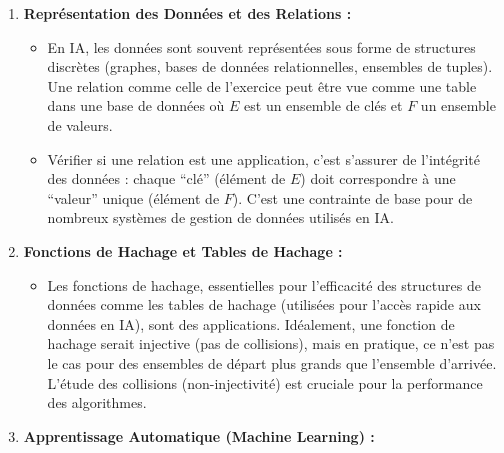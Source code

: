 \documentclass[12pt,a4paper]{report}
\providecommand{\tightlist}{%
  \setlength{\itemsep}{0pt}\setlength{\parskip}{0pt}}
\begin{document}
\begin{enumerate}
\def\labelenumi{\arabic{enumi}.}
\tightlist
\item
  \textbf{Représentation des Données et des Relations :}

  \begin{itemize}
  \tightlist
  \item
    En IA, les données sont souvent représentées sous forme de
    structures discrètes (graphes, bases de données relationnelles,
    ensembles de tuples). Une relation comme celle de l'exercice peut
    être vue comme une table dans une base de données où \(E\) est un
    ensemble de clés et \(F\) un ensemble de valeurs.
  \item
    Vérifier si une relation est une application, c'est s'assurer de
    l'intégrité des données : chaque ``clé'' (élément de \(E\)) doit
    correspondre à une ``valeur'' unique (élément de \(F\)). C'est une
    contrainte de base pour de nombreux systèmes de gestion de données
    utilisés en IA.
  \end{itemize}
\item
  \textbf{Fonctions de Hachage et Tables de Hachage :}

  \begin{itemize}
  \tightlist
  \item
    Les fonctions de hachage, essentielles pour l'efficacité des
    structures de données comme les tables de hachage (utilisées pour
    l'accès rapide aux données en IA), sont des applications.
    Idéalement, une fonction de hachage serait injective (pas de
    collisions), mais en pratique, ce n'est pas le cas pour des
    ensembles de départ plus grands que l'ensemble d'arrivée. L'étude
    des collisions (non-injectivité) est cruciale pour la performance
    des algorithmes.
  \end{itemize}
\item
  \textbf{Apprentissage Automatique (Machine Learning) :}


\end{enumerate}
\end{document}
